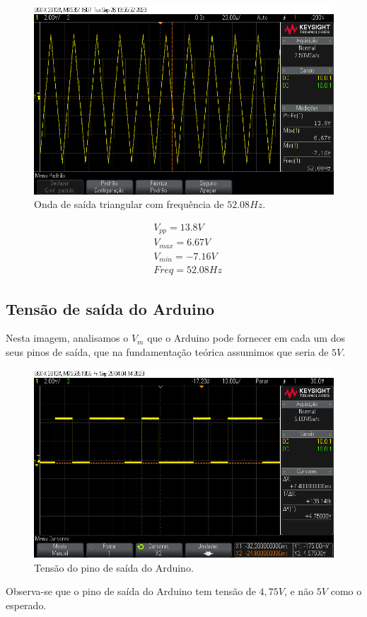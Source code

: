 \begin{figure}[H]
    \centering
    \includegraphics[width=0.5\columnwidth]{images/triangular_0.png}
    \caption{Onda de saída triangular com frequência de $52.08Hz$.}
\end{figure}

\begin{equation}
    \begin{aligned}
         & V_{pp} = 13.8 V    \\
         & V_{max} = 6.67 V   \\
         & V_{min} =  -7.16 V \\
         & Freq = 52.08 Hz
    \end{aligned}
\end{equation}

\subsection{Tensão de saída do Arduino}

Nesta imagem, analisamos o $V_m$ que o Arduino pode fornecer em cada um dos seus pinos de saída, que na fundamentação teórica assumimos que seria de $5V$.

\begin{figure}[H]
    \centering
    \includegraphics[width=0.5\columnwidth]{images/VM_segundo_laboratorio.png}
    \caption{Tensão do pino de saída do Arduino.}
\end{figure}

Observa-se que o pino de saída do Arduino tem tensão de $4,75V$, e não $5V$ como o esperado.

\newpage
